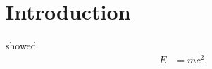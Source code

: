 
\section{Introduction}
\label{sec:introduction}

\cite{einstein} showed 
%
\begin{align}
  \label{eq:1}
  E &= mc^2.
\end{align}


